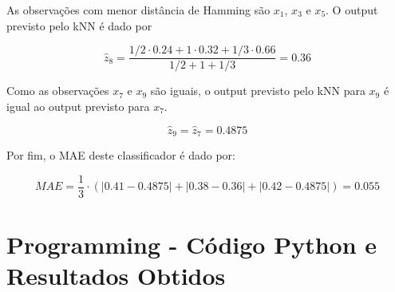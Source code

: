 \documentclass[a4paper,12pt]{article} %
\begin{document}
\begin{enumerate}
As observações com menor distância de Hamming são $x_1$, $x_3$ e $x_5$. O output previsto pelo kNN é dado por 

\begin{equation*}
    \hat{z}_{8} = \frac{1/2 \cdot 0.24 + 1 \cdot 0.32 + 1/3 \cdot 0.66}{1/2 + 1 + 1/3} = 0.36
\end{equation*}

Como as observações $x_7$ e $x_9$ são iguais, o output previsto pelo kNN para  $x_9$ é igual ao output previsto para $x_7$.

\begin{equation*}
    \hat{z}_{9} = \hat{z}_{7} = 0.4875
\end{equation*}

Por fim, o MAE deste classificador é dado por:

\begin{equation*}
    MAE = \frac{1}{3} \cdot (|0.41 - 0.4875| + |0.38 - 0.36| + |0.42 - 0.4875|) = 0.055
\end{equation*}

\end{enumerate}

\clearpage
\section*{Programming - Código Python e Resultados Obtidos}
\end{document}
